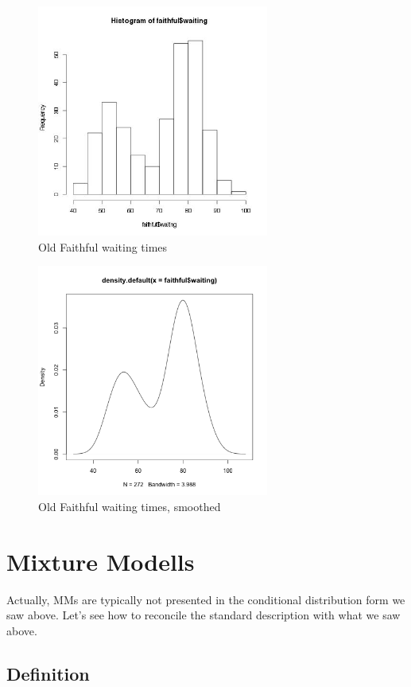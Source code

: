 \documentclass[11pt]{article}
\begin{document}
\begin{figure}[tb]
\centerline{
\includegraphics[width=3.0in]{Faithful.jpg}
}
\caption{Old Faithful waiting times}
\label{faithfulhist}
\end{figure}

\begin{figure}[tb]
\centerline{
\includegraphics[width=3.0in]{FaithfulSmooth.png}
}
\caption{Old Faithful waiting times, smoothed}
\label{faithfulhistsmooth}
\end{figure}

\section{Mixture Modells}

Actually, MMs are typically not presented in the conditional distribution
form we saw above.  Let's see how to reconcile the standard description
with what we saw above.

\subsection{Definition}
\end{document}
